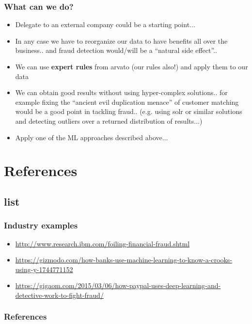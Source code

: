 \documentclass{beamer}
\begin{document}
\begin{frame}
  \frametitle{What can we do? }
  \begin{itemize}
	\item<+-> Delegate to an external company could be a starting point...
	\item<+-> In any case we have to reorganize our data to have benefits all over the business.. and fraud detection would/will be a ``natural side effect''.. 
	\item<+-> We can use \textbf{expert rules} from arvato (our rules also!) and apply them to our data 
	\item<+-> We can obtain good results without using hyper-complex solutions.. for example fixing the ``ancient evil duplication menace'' of customer matching would be a good point in tackling fraud.. (e.g. using solr or similar solutions and detecting outliers over a returned distribution of results...) 
	\item<+-> Apply one of the ML approaches described above...
   \end{itemize}
\end{frame}


\section{References}
\subsection{list}
\begin{frame}
        \frametitle{Industry examples}
        \begin{itemize}
	\item \href{http://www.research.ibm.com/foiling-financial-fraud.shtml}{http://www.research.ibm.com/foiling-financial-fraud.shtml}
	\item \href{https://gizmodo.com/how-banks-use-machine-learning-to-know-a-crooks-using-y-1744771152}{https://gizmodo.com/how-banks-use-machine-learning-to-know-a-crooks-using-y-1744771152}
	\item \href{https://gigaom.com/2015/03/06/how-paypal-uses-deep-learning-and-detective-work-to-fight-fraud/}{https://gigaom.com/2015/03/06/how-paypal-uses-deep-learning-and-detective-work-to-fight-fraud/}
   \end{itemize}
\end{frame}


\begin{frame}
        \frametitle{References}
        \nocite{*}
        
        
\end{frame}
\end{document}
